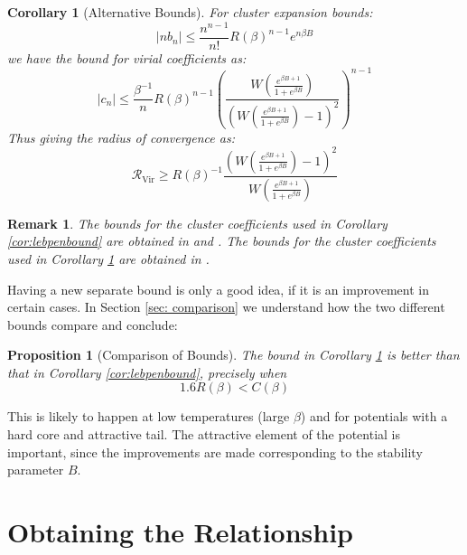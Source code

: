 \documentclass[reqno]{amsart}
\def\be{\begin{equation}}
\def\ee{\end{equation}}
\numberwithin{equation}{section}
\newtheorem{proposition}[theorem]{Proposition}
\newtheorem{corollary}[theorem]{Corollary}
\newtheorem{remark}{Remark}
\begin{document}
\begin{corollary}[Alternative Bounds]
\label{cor:mybounds}
For cluster expansion bounds:
\be |nb_n| \leq \frac{n^{n-1}}{n!}R(\beta)^{n-1}e^{n\beta B} \ee
we have the bound for virial coefficients as:
\be |c_n| \leq \frac{\beta^{-1}}{n}R(\beta)^{n-1} \left( \frac{W\left(\frac{e^{\beta B+1}}{1+e^{\beta B}}\right)}{\left(W\left(\frac{e^{\beta B +1}}{1+e^{\beta B}}\right)-1\right)^2}\right)^{n-1} \ee
Thus giving the radius of convergence as:
\be \mathcal{R}_{\text{Vir}} \geq R(\beta)^{-1} \frac{\left(W\left(\frac{e^{\beta B +1}}{1+e^{\beta B}}\right)-1\right)^2}{W\left(\frac{e^{\beta B+1}}{1+e^{\beta B}}\right)} \ee
\end{corollary}
\begin{remark}
The bounds for the cluster coefficients used in Corollary \ref{cor:lebpenbound} are obtained in \cite{R69} and \cite{LPen64}.  
The bounds for the cluster coefficients used in Corollary \ref{cor:mybounds} are obtained in \cite{PU09}.
\end{remark}
Having a new separate bound is only a good idea, if it is an improvement in certain cases. In Section \ref{sec: comparison} we understand how the two different bounds compare and conclude:
\begin{proposition}[Comparison of Bounds]
\label{prop: comparison}
The bound in Corollary \ref{cor:mybounds} is better than that in Corollary \ref{cor:lebpenbound}, precisely when 
\be 1.6R(\beta) < C(\beta) \ee
\end{proposition}
This is likely to happen at low temperatures (large $\beta$) and for potentials with a hard core and attractive tail. The attractive element of the potential is important, since the improvements are made corresponding to the stability parameter $B$.


\section{Obtaining the Relationship}
\end{document}
